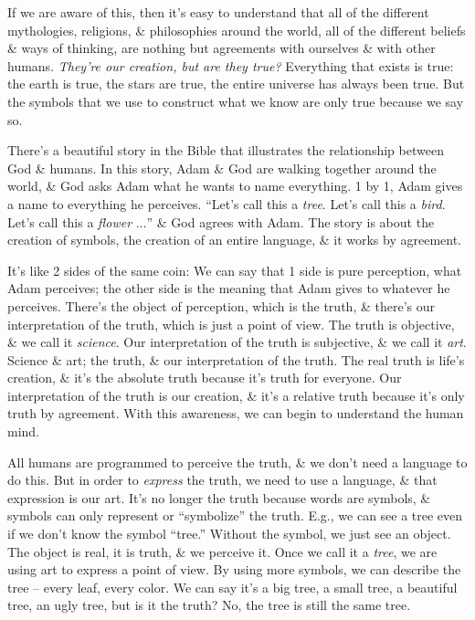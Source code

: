 \documentclass{article}
\numberwithin{equation}{section}
\begin{document}
If we are aware of this, then it's easy to understand that all of the different mythologies, religions, \& philosophies around the world, all of the different beliefs \& ways of thinking, are nothing but agreements with ourselves \& with other humans. \textit{They're our creation, but are they true?} Everything that exists is true: the earth is true, the stars are true, the entire universe has always been true. But the symbols that we use to construct what we know are only true because we say so.

There's a beautiful story in the Bible that illustrates the relationship between God \& humans. In this story, Adam \& God are walking together around the world, \& God asks Adam what he wants to name everything. 1 by 1, Adam gives a name to everything he perceives. ``Let's call this a \textit{tree}. Let's call this a \textit{bird}. Let's call this a \textit{flower} $\ldots$'' \& God agrees with Adam. The story is about the creation of symbols, the creation of an entire language, \& it works by agreement.

It's like 2 sides of the same coin: We can say that 1 side is pure perception, what Adam perceives; the other side is the meaning that Adam gives to whatever he perceives. There's the object of perception, which is the truth, \& there's our interpretation of the truth, which is just a point of view. The truth is objective, \& we call it \textit{science}. Our interpretation of the truth is subjective, \& we call it \textit{art}. Science \& art; the truth, \& our interpretation of the truth. The real truth is life's creation, \& it's the absolute truth because it's truth for everyone. Our interpretation of the truth is our creation, \& it's a relative truth because it's only truth by agreement. With this awareness, we can begin to understand the human mind.

All humans are programmed to perceive the truth, \& we don't need a language to do this. But in order to \textit{express} the truth, we need to use a language, \& that expression is our art. It's no longer the truth because words are symbols, \& symbols can only represent or ``symbolize'' the truth. E.g., we can see a tree even if we don't know the symbol ``tree.'' Without the symbol, we just see an object. The object is real, it is truth, \& we perceive it. Once we call it a \textit{tree}, we are using art to express a point of view. By using more symbols, we can describe the tree -- every leaf, every color. We can say it's a big tree, a small tree, a beautiful tree, an ugly tree, but is it the truth? No, the tree is still the same tree.
\end{document}
